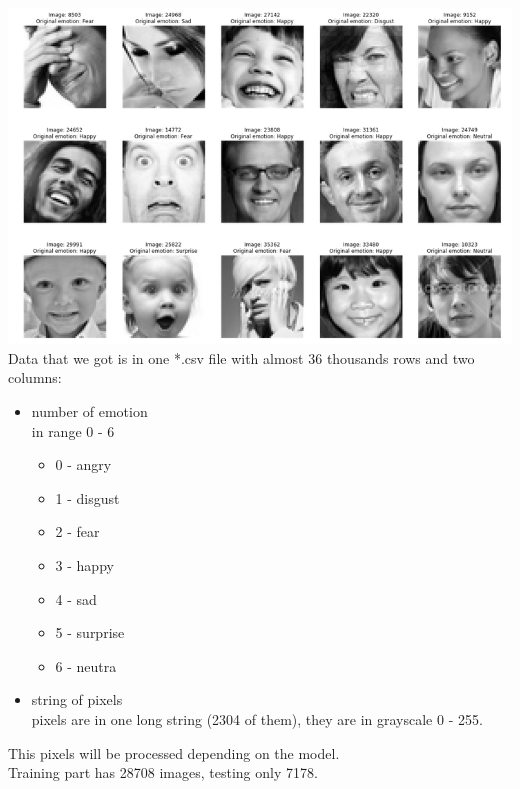 \includegraphics[scale=0.75]{images/ferCover.png}
\\Data that we got is in one *.csv file with almost 36 thousands rows and two columns:
\begin{itemize}
  \item number of emotion \\
        in range 0 - 6
        \begin{itemize}
          \item 0 - angry
          \item 1 - disgust
          \item 2 - fear
          \item 3 - happy
          \item 4 - sad
          \item 5 - surprise
          \item 6 - neutra
        \end{itemize}
  \item string of pixels \\
        pixels are in one long string (2304 of them), they are in grayscale 0 - 255.\\
\end{itemize}
This pixels will be processed depending on the model.\\
Training part has 28708 images, testing only 7178.